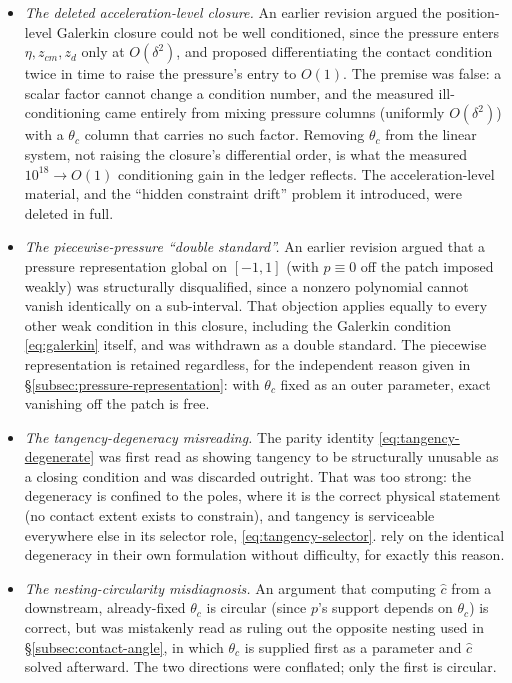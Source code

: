\begin{itemize}
\item \emph{The deleted acceleration-level closure.} An earlier revision argued the position-level Galerkin closure could not be well conditioned, since the pressure enters $\eta,z_{cm},z_d$ only at $O(\delta^2)$, and proposed differentiating the contact condition twice in time to raise the pressure's entry to $O(1)$. The premise was false: a scalar factor cannot change a condition number, and the measured ill-conditioning came entirely from mixing pressure columns (uniformly $O(\delta^2)$) with a $\theta_c$ column that carries no such factor. Removing $\theta_c$ from the linear system, not raising the closure's differential order, is what the measured $10^{18}\to O(1)$ conditioning gain in the ledger reflects. The acceleration-level material, and the ``hidden constraint drift'' problem it introduced, were deleted in full.
\item \emph{The piecewise-pressure ``double standard''.} An earlier revision argued that a pressure representation global on $[-1,1]$ (with $p\equiv0$ off the patch imposed weakly) was structurally disqualified, since a nonzero polynomial cannot vanish identically on a sub-interval. That objection applies equally to every other weak condition in this closure, including the Galerkin condition \eqref{eq:galerkin} itself, and was withdrawn as a double standard. The piecewise representation is retained regardless, for the independent reason given in \S\ref{subsec:pressure-representation}: with $\theta_c$ fixed as an outer parameter, exact vanishing off the patch is free.
\item \emph{The tangency-degeneracy misreading.} The parity identity \eqref{eq:tangency-degenerate} was first read as showing tangency to be structurally unusable as a closing condition and was discarded outright. That was too strong: the degeneracy is confined to the poles, where it is the correct physical statement (no contact extent exists to constrain), and tangency is serviceable everywhere else in its selector role, \eqref{eq:tangency-selector}. \cite{AgueroEtAl2026} rely on the identical degeneracy in their own formulation without difficulty, for exactly this reason.
\item \emph{The nesting-circularity misdiagnosis.} An argument that computing $\hat c$ from a downstream, already-fixed $\theta_c$ is circular (since $p$'s support depends on $\theta_c$) is correct, but was mistakenly read as ruling out the opposite nesting used in \S\ref{subsec:contact-angle}, in which $\theta_c$ is supplied first as a parameter and $\hat c$ solved afterward. The two directions were conflated; only the first is circular.

\end{itemize}
